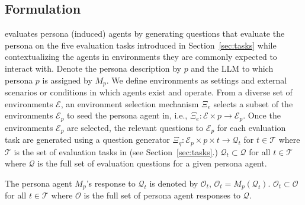 \subsection{Formulation}

\benchmark evaluates persona (induced) agents by generating questions that evaluate the persona on the five evaluation tasks introduced in Section~\ref{sec:tasks} while contextualizing the agents in environments they are commonly expected to interact with. Denote the persona description by $p$ and the LLM to which persona $p$ is assigned by $M_p$.
We define environments as settings and external scenarios or conditions in which agents exist and operate. From a diverse set of environments $\mathcal{E}$, an environment selection mechanism $\Xi_e$ selects a subset of the environments $\mathcal{E}_{p}$ to seed the persona agent in, i.e., $\Xi_e: \mathcal{E} \times p \to \mathcal{E}_p$. Once the environments $\mathcal{E}_p$ are selected, the relevant questions to $\mathcal{E}_p$ for each evaluation task are generated using a question generator $\Xi_q: \mathcal{E}_p \times p \times t \to \mathcal{Q}_t$ for $t \in \mathcal{T}$ where $\mathcal{T}$ is the set of evaluation tasks in \benchmark (see Section~\ref{sec:tasks}.) $\mathcal{Q}_t \subset \mathcal{Q}$ for all $t \in \mathcal{T}$ where $\mathcal{Q}$ is the full set of evaluation questions for a given persona agent.

The persona agent $M_p$'s response to $\mathcal{Q}_t$ is denoted by $\mathcal{O}_t$, $\mathcal{O}_t = M_p(\mathcal{Q}_t)$. $\mathcal{O}_t \subset \mathcal{O}$ for all $t \in \mathcal{T}$ where $\mathcal{O}$ is the full set of persona agent responses to $\mathcal{Q}$.

